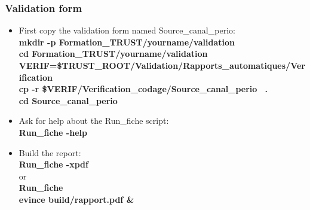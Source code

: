 \documentclass[10pt, hyperref={unicode=true,pdfusetitle, bookmarks=true,bookmarksnumbered=false,bookmarksopen=false, breaklinks=false,pdfborder={0 0 1},backref=true,colorlinks=true,linkcolor=darkblue,pageanchor}]{beamer}
\begin{document}
\begin{frame}
\frametitle{Validation form}
\begin{block}{}

\begin{itemize}
\item First copy the validation form named Source\_canal\_perio:\\
{\small{
\textbf{mkdir -p Formation\_TRUST/yourname/validation} \\
\textbf{cd  Formation\_TRUST/yourname/validation} \\
\textbf{VERIF=\$TRUST\_ROOT/Validation/Rapports\_automatiques/Verification} \\
\textbf{cp -r \$VERIF/Verification\_codage/Source\_canal\_perio \, .} \\
\textbf{cd Source\_canal\_perio}
 }}\\

\item Ask for help about the Run\_fiche script:\\
\textbf{Run\_fiche -help}

\item Build the report:\\
\textbf{Run\_fiche -xpdf} \\
or\\
\textbf{Run\_fiche} \\
\textbf{evince build/rapport.pdf \&} 
\end{itemize}

\end{block}
\end{frame}
\end{document}
